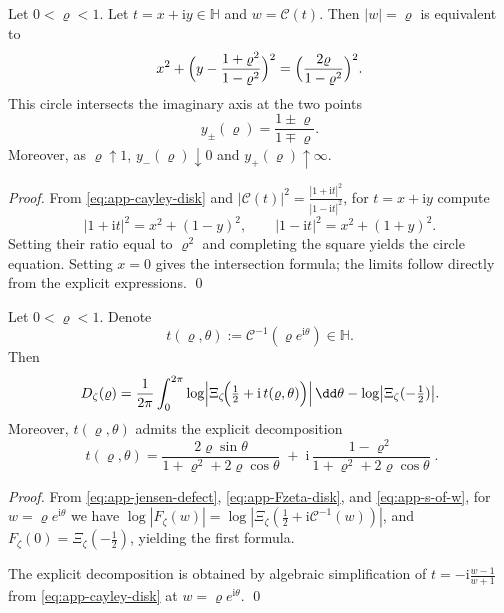 \begin{proposition}[Cayley Preimage of \texorpdfstring{$|w|=\varrho$}{|w|=varrho} Is an Explicit Circle]\label{prop:app-cayley-preimage-modulus-circle}
Let \(0<\varrho<1\).
Let \(t=x+\mathrm{i}y\in\mathbb{H}\) and \(w=\mathcal{C}(t)\).
Then \(|w|=\varrho\) is equivalent to
\[
x^2+\Bigl(y-\frac{1+\varrho^2}{1-\varrho^2}\Bigr)^2=\Bigl(\frac{2\varrho}{1-\varrho^2}\Bigr)^2.
\]
This circle intersects the imaginary axis at the two points
\[
y_{\pm}(\varrho)=\frac{1\pm\varrho}{1\mp\varrho}.
\]
Moreover, as \(\varrho\uparrow 1\), \(y_{-}(\varrho)\downarrow 0\) and \(y_{+}(\varrho)\uparrow\infty\).
\end{proposition}
\begin{proof}
From \eqref{eq:app-cayley-disk} and \(|\mathcal{C}(t)|^2=\frac{|1+\mathrm{i}t|^2}{|1-\mathrm{i}t|^2}\), for \(t=x+\mathrm{i}y\) compute
\[
|1+\mathrm{i}t|^2=x^2+(1-y)^2,
\qquad
|1-\mathrm{i}t|^2=x^2+(1+y)^2.
\]
Setting their ratio equal to \(\varrho^2\) and completing the square yields the circle equation.
Setting \(x=0\) gives the intersection formula; the limits follow directly from the explicit expressions. \qed
\end{proof}

\begin{proposition}\label{prop:app-jensen-defect-upperhalf-circle-average}
Let \(0<\varrho<1\).
Denote
\[
t(\varrho,\theta):=\mathcal{C}^{-1}(\varrho e^{\mathrm{i}\theta})\in\mathbb{H}.
\]
Then
\[
D_{\zeta}(\varrho)
=\frac{1}{2\pi}\int_{0}^{2\pi}\log\Bigl|\Xi_{\zeta}\!\Bigl(\tfrac12+\mathrm{i}\,t(\varrho,\theta)\Bigr)\Bigr|\,\dd\theta
-\log\bigl|\Xi_{\zeta}(-\tfrac12)\bigr|.
\]
Moreover, \(t(\varrho,\theta)\) admits the explicit decomposition
\begin{equation}\label{eq:app-t-rho-theta-explicit}
\boxed{\;
t(\varrho,\theta)
=\frac{2\varrho\sin\theta}{1+\varrho^2+2\varrho\cos\theta}
\;+\;
\mathrm{i}\,\frac{1-\varrho^2}{1+\varrho^2+2\varrho\cos\theta}\; }.
\end{equation}
\end{proposition}
\begin{proof}
From \eqref{eq:app-jensen-defect}, \eqref{eq:app-Fzeta-disk}, and \eqref{eq:app-s-of-w}, for \(w=\varrho e^{\mathrm{i}\theta}\) we have
\(
\log|F_{\zeta}(w)|=\log|\Xi_{\zeta}(\tfrac12+\mathrm{i}\mathcal{C}^{-1}(w))|
\), and \(F_{\zeta}(0)=\Xi_{\zeta}(-\tfrac12)\), yielding the first formula.
\par
The explicit decomposition is obtained by algebraic simplification of \(t=-\mathrm{i}\frac{w-1}{w+1}\) from \eqref{eq:app-cayley-disk} at \(w=\varrho e^{\mathrm{i}\theta}\). \qed
\end{proof}

